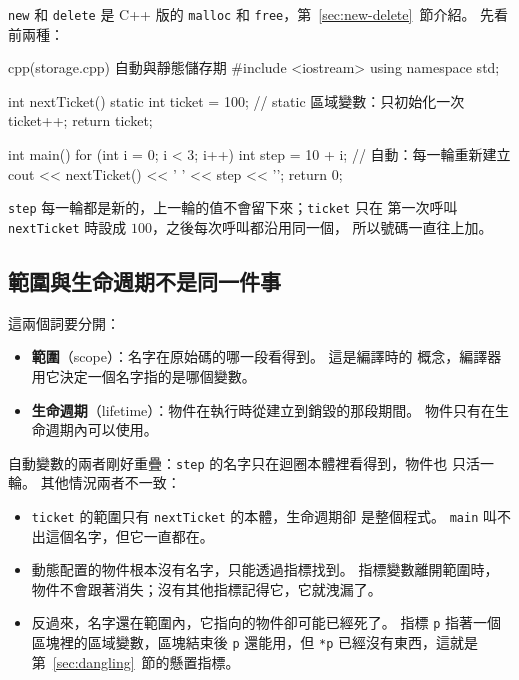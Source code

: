 \texttt{new} 和 \texttt{delete} 是 C++ 版的 \texttt{malloc} 和
\texttt{free}，第~\ref{sec:new-delete}~節介紹。 先看前兩種：

\begin{example}[label=ex:storage]{cpp}{(storage.cpp) 自動與靜態儲存期}
#include <iostream>
using namespace std;

int nextTicket() {
    static int ticket = 100;   // static 區域變數：只初始化一次
    ticket++;
    return ticket;
}

int main() {
    for (int i = 0; i < 3; i++) {
        int step = 10 + i;     // 自動：每一輪重新建立
        cout << nextTicket() << ' ' << step << '\n';
    }
    return 0;
}
\end{example}


\texttt{step} 每一輪都是新的，上一輪的值不會留下來；\texttt{ticket} 只在
第一次呼叫 \texttt{nextTicket} 時設成 $100$，之後每次呼叫都沿用同一個，
所以號碼一直往上加。

\subsection{範圍與生命週期不是同一件事}

這兩個詞要分開：

\begin{itemize}
\item \textbf{範圍}（scope）：名字在原始碼的哪一段看得到。 這是編譯時的
概念，編譯器用它決定一個名字指的是哪個變數。
\item \textbf{生命週期}（lifetime）：物件在執行時從建立到銷毀的那段期間。
物件只有在生命週期內可以使用。
\end{itemize}

自動變數的兩者剛好重疊：\texttt{step} 的名字只在迴圈本體裡看得到，物件也
只活一輪。 其他情況兩者不一致：

\begin{itemize}
\item \texttt{ticket} 的範圍只有 \texttt{nextTicket} 的本體，生命週期卻
是整個程式。 \texttt{main} 叫不出這個名字，但它一直都在。
\item 動態配置的物件根本沒有名字，只能透過指標找到。 指標變數離開範圍時，
物件不會跟著消失；沒有其他指標記得它，它就洩漏了。
\item 反過來，名字還在範圍內，它指向的物件卻可能已經死了。 指標
\texttt{p} 指著一個區塊裡的區域變數，區塊結束後 \texttt{p} 還能用，但
\texttt{*p} 已經沒有東西，這就是第~\ref{sec:dangling}~節的懸置指標。
\end{itemize}

